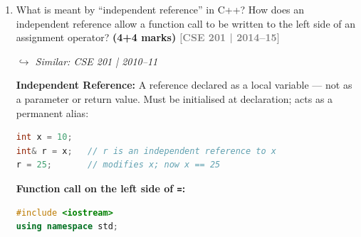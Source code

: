 \documentclass[12pt,a3paper]{article}
\newcommand{\yr}[1]{\hfill\textcolor{gray}{\small\textbf{[#1]}}}
\newcommand{\mk}[1]{\textcolor{orange!70!black}{\small\textbf{(#1 marks)}}}
\newcommand{\variant}[1]{\par\vspace{1pt}\textcolor{blue!50!black}%
  {\footnotesize\textit{$\hookrightarrow$ Similar: #1}}}
\begin{document}
\begin{enumerate}
\begin{tcolorbox}[enhanced,breakable,ansbox,
  colback=cC!4,colframe=cC,boxrule=0.8pt,arc=5pt,
  title={\textbf{Answer --- Why Namespace is Added to C++}},
  fonttitle=\bfseries\color{white},colbacktitle=cC]
\textbf{Solution --- namespace:}

A \texttt{namespace} groups related identifiers under a unique name,
preventing collisions.

\begin{lstlisting}[language=C++]
#include <iostream>
using namespace std;

namespace LibA {
    void print() { cout << "LibA::print()" << endl; }
}

namespace LibB {
    void print() { cout << "LibB::print()" << endl; }
}

int main() {
    LibA::print();   // no ambiguity
    LibB::print();
    return 0;
}
\end{lstlisting}
\textbf{Output:}
\begin{verbatim}
LibA::print()
LibB::print()
\end{verbatim}

The entire C++ standard library lives in namespace \texttt{std}
(\texttt{cout}, \texttt{cin}, \texttt{vector}, etc.) precisely to
avoid collisions with user-defined names.
\end{tcolorbox}

\item What is meant by ``independent reference'' in C++? How does an independent reference allow a function call to be written to the left side of an assignment operator? \mk{4+4}
\yr{CSE 201 | 2014--15}
\variant{CSE 201 | 2010--11}

\begin{tcolorbox}[enhanced,breakable,ansbox,colback=cC!4,colframe=cC,
  boxrule=0.8pt,arc=5pt,
  title={\textbf{Answer --- Independent reference and l-value assignment}},
  fonttitle=\bfseries\color{white},colbacktitle=cC]

\textbf{Independent Reference:} A reference declared as a local
variable --- not as a parameter or return value.  Must be initialised
at declaration; acts as a permanent alias:

\begin{lstlisting}[language=C++]
int x = 10;
int& r = x;   // r is an independent reference to x
r = 25;       // modifies x; now x == 25
\end{lstlisting}

\textbf{Function call on the left side of \texttt{=}:}

\begin{lstlisting}[language=C++]
#include <iostream>
using namespace std;


\end{lstlisting}
\end{tcolorbox}
\end{enumerate}
\end{document}
